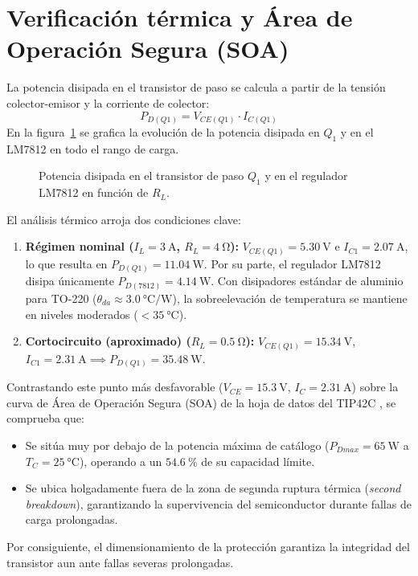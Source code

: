 \section{Verificación térmica y Área de Operación Segura (SOA)}
\label{sec.c5:soa}

La potencia disipada en el transistor de paso se calcula a partir de la tensión colector-emisor y la corriente de
colector:
\begin{equation*}
    P_{D(Q1)} = V_{CE(Q1)} \cdot I_{C(Q1)}
\end{equation*}
En la figura~\ref{fig.c5:potencias} se grafica la evolución de la potencia disipada en $Q_1$ y en el LM7812 en todo el
rango de carga.

\begin{figure}[!ht]
    \centering
    
    \caption{Potencia disipada en el transistor de paso $Q_1$ y en el regulador LM7812 en función de $R_L$.}
    \label{fig.c5:potencias}
\end{figure}

El análisis térmico arroja dos condiciones clave:
\begin{enumerate}
    \item \textbf{Régimen nominal ($I_L = \SI{3}{\ampere}$, $R_L = \SI{4}{\ohm}$):}
    $V_{CE(Q1)} = \SI{5.30}{\volt}$ e $I_{C1} = \SI{2.07}{\ampere}$, lo que resulta en $P_{D(Q1)} = \SI{11.04}{\watt}$.
    Por su parte, el regulador LM7812 disipa únicamente $P_{D(7812)} = \SI{4.14}{\watt}$. Con disipadores estándar
    de aluminio para TO-220 ($\theta_{da} \approx \SI{3.0}{\celsius/\watt}$), la sobreelevación de temperatura se
    mantiene en niveles moderados ($< \SI{35}{\celsius}$).
\item \textbf{Cortocircuito (aproximado) ($R_L = \SI{0.5}{\ohm}$):} $V_{CE(Q1)} = \SI{15.34}{\volt}$,
    $I_{C1} = \SI{2.31}{\ampere} \implies P_{D(Q1)} = \SI{35.48}{\watt}$.
\end{enumerate}

Contrastando este punto más desfavorable ($V_{CE} = \SI{15.3}{\volt}$, $I_C = \SI{2.31}{\ampere}$) sobre la curva
de Área de Operación Segura (SOA) de la hoja de datos del TIP42C \cite{onsemi_tip42c}, se comprueba que:
\begin{itemize}
    \item Se sitúa muy por debajo de la potencia máxima de catálogo ($P_{Dmax} = \SI{65}{\watt}$ a $T_C = \SI{25}{\celsius}$),
    operando a un $\SI{54.6}{\percent}$ de su capacidad límite.
    \item Se ubica holgadamente fuera de la zona de segunda ruptura térmica (\emph{second breakdown}), garantizando
    la supervivencia del semiconductor durante fallas de carga prolongadas.
\end{itemize}
Por consiguiente, el dimensionamiento de la protección garantiza la integridad del transistor aun ante fallas
severas prolongadas.

